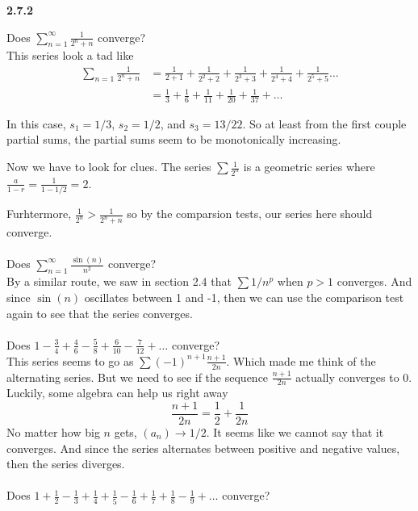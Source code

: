 \textbf{2.7.2}

Does $\sum^{\infty}_{n=1} \frac{1}{2^n + n}$ converge?
\\

This series look a tad like
\begin{align*}
\sum_{n=1} \frac{1}{2^n + n} &= \frac{1}{2+1} + \frac{1}{2^2 +2} + \frac{1}{2^3 + 3} + \frac{1}{2^4 +4} + \frac{1}{2^5 +5} \ldots \\
&= \frac{1}{3} + \frac{1}{6} + \frac{1}{11} + \frac{1}{20} + \frac{1}{37} + \ldots
\end{align*}

In this case, $s_1 = 1/3$, $s_2 = 1/2$, and $s_3 = 13/22$.
So at least from the first couple partial sums, the partial sums seem to be monotonically increasing.

Now we have to look for clues.
The series $\sum \frac{1}{2^n}$ is a geometric series where $\frac{a}{1-r} = \frac{1}{1 - 1/2} = 2$.

Furhtermore, $\frac{1}{2^n} > \frac{1}{2^n +n}$ so by the comparsion tests, our series here should
converge.
\\~\\


Does $\sum^{\infty}_{n=1} \frac{\sin(n)}{n^2}$ converge?
\\

By a similar route, we saw in section 2.4 that $\sum 1/n^p$ when $p>1$ converges.
And since $\sin (n)$ oscillates between 1 and -1, then we can use the comparison test again to
see that the series converges.
\\~\\


Does $1 - \frac{3}{4} + \frac{4}{6} - \frac{5}{8} + \frac{6}{10} - \frac{7}{12} + \ldots$ converge?
\\

This series seems to go as $\sum (-1)^{n+1} \frac{n+1}{2n}$.
Which made me think of the alternating series.
But we need to see if the sequence $\frac{n+1}{2n}$ actually converges to 0.
Luckily, some algebra can help us right away
$$
\frac{n+1}{2n} = \frac{1}{2} + \frac{1}{2n}
$$
No matter how big $n$ gets, $(a_n) \rightarrow 1/2$.
It seems like we cannot say that it converges.
And since the series alternates between positive and negative values, then the series diverges.
\\~\\

Does $1 + \frac{1}{2} - \frac{1}{3} + \frac{1}{4} + \frac{1}{5} - \frac{1}{6} + \frac{1}{7} + \frac{1}{8} -\frac{1}{9} + \ldots$ converge?
\\

